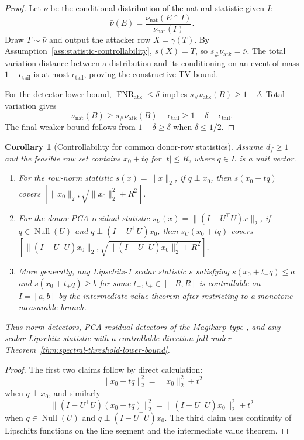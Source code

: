 \documentclass{article}
\theoremstyle{plain}
\newtheorem{corollary}[theorem]{Corollary}
\theoremstyle{definition}
\theoremstyle{remark}
\begin{document}
\begin{proof}
Let $\bar\nu$ be the conditional distribution of the natural statistic given $I$:
\[
\bar\nu(E)=\frac{\nu_{\mathrm{nat}}(E\cap I)}{\nu_{\mathrm{nat}}(I)}.
\]
Draw $T\sim\bar\nu$ and output the attacker row $X=\gamma(T)$. By Assumption~\ref{ass:statistic-controllability}, $s(X)=T$, so $s_\#\nu_{\mathrm{atk}}=\bar\nu$. The total variation distance between a distribution and its conditioning on an event of mass $1-\epsilon_{\mathrm{tail}}$ is at most $\epsilon_{\mathrm{tail}}$, proving the constructive TV bound.

For the detector lower bound, $\operatorname{FNR}_{\mathrm{atk}}\le\delta$ implies $s_\#\nu_{\mathrm{atk}}(B)\ge 1-\delta$. Total variation gives
\[
\nu_{\mathrm{nat}}(B)
\ge
s_\#\nu_{\mathrm{atk}}(B)-\epsilon_{\mathrm{tail}}
\ge
1-\delta-\epsilon_{\mathrm{tail}}.
\]
The final weaker bound follows from $1-\delta\ge\delta$ when $\delta\le 1/2$.
\end{proof}

\begin{corollary}[Controllability for common donor-row statistics]
\label{cor:common-statistic-controllability}
Assume $d_f\ge 1$ and the feasible row set contains $x_0+tq$ for $|t|\le R$, where $q\in L$ is a unit vector.
\begin{enumerate}[leftmargin=*]
\item For the row-norm statistic $s(x)=\|x\|_2$, if $q\perp x_0$, then $s(x_0+tq)$ covers $[\|x_0\|_2,\sqrt{\|x_0\|_2^2+R^2}]$.
\item For the donor PCA residual statistic $s_U(x)=\|(I-U^\top U)x\|_2$, if $q\in\operatorname{Null}(U)$ and $q\perp (I-U^\top U)x_0$, then $s_U(x_0+tq)$ covers $[\|(I-U^\top U)x_0\|_2,\sqrt{\|(I-U^\top U)x_0\|_2^2+R^2}]$.
\item More generally, any Lipschitz-1 scalar statistic $s$ satisfying $s(x_0+t_-q)\le a$ and $s(x_0+t_+q)\ge b$ for some $t_-,t_+\in[-R,R]$ is controllable on $I=[a,b]$ by the intermediate value theorem after restricting to a monotone measurable branch.
\end{enumerate}
Thus norm detectors, PCA-residual detectors of the Magikarp type \citep{land2024fishingmagikarpautomaticallydetecting}, and any scalar Lipschitz statistic with a controllable direction fall under Theorem~\ref{thm:spectral-threshold-lower-bound}.
\end{corollary}

\begin{proof}
The first two claims follow by direct calculation:
\[
\|x_0+tq\|_2^2=\|x_0\|_2^2+t^2
\]
when $q\perp x_0$, and similarly
\[
\|(I-U^\top U)(x_0+tq)\|_2^2
=
\|(I-U^\top U)x_0\|_2^2+t^2
\]
when $q\in\operatorname{Null}(U)$ and $q\perp (I-U^\top U)x_0$. The third claim uses continuity of Lipschitz functions on the line segment and the intermediate value theorem.
\end{proof}
\end{document}
